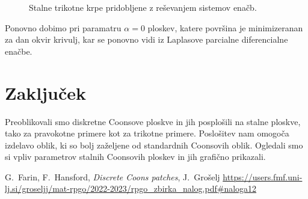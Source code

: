 \documentclass[a4paper,12pt]{article}
\begin{document}
\begin{figure}[ht!]
   \centering
   
   \caption{Stalne trikotne krpe pridobljene z reševanjem sistemov enačb.}
\label{fig:trikotne}
\end{figure}

Ponovno dobimo pri paramatru $\alpha = 0$ ploskev, 
katere površina je minimizeranan za dan okvir krivulj, kar se ponovno vidi iz 
Laplasove parcialne diferencialne enačbe.

\section{Zaključek}

Preoblikovali smo diskretne Coonsove ploskve in jih posplošili na stalne
ploskve, tako za pravokotne primere kot za trikotne primere. Poslošitev nam omogoča
izdelavo oblik, ki so bolj zaželjene od standardnih Coonsovih oblik. Ogledali smo 
si vpliv parametrov stalnih Coonsovih ploskev in jih grafično prikazali.

\newpage

\begin{thebibliography}{99}
   G.~Farin, F.~Hansford, \emph{Discrete Coons patches}, 
   J.~Grošelj \url{https://users.fmf.uni-lj.si/groseljj/mat-rpgo/2022-2023/rpgo_zbirka_nalog.pdf#naloga12}
\end{thebibliography}
\end{document}
